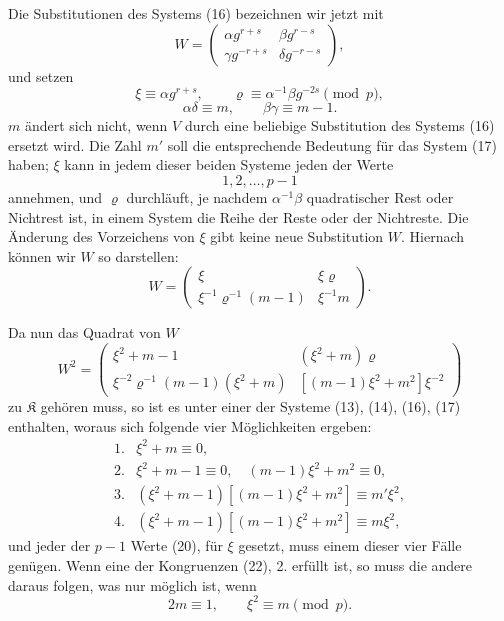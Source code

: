 \documentclass[11pt]{article}
\providecommand{\Kgrp}{\mathfrak K}
\begin{document}
Die Substitutionen des Systems (16) bezeichnen wir jetzt mit
\[
 W=\begin{pmatrix}
 \alpha g^{r+s} & \beta g^{r-s}\\
 \gamma g^{-r+s} & \delta g^{-r-s}
 \end{pmatrix},
\]
und setzen
\begin{equation}
 \xi\equiv\alpha g^{r+s},\qquad \varrho\equiv\alpha^{-1}\beta g^{-2s}\pmod p,
\tag{18}
\end{equation}
\begin{equation}
 \alpha\delta\equiv m,\qquad \beta\gamma\equiv m-1.
\tag{19}
\end{equation}
$m$ ändert sich nicht, wenn $V$ durch eine beliebige Substitution des Systems (16) ersetzt wird. Die Zahl $m'$ soll die entsprechende Bedeutung für das System (17) haben; $\xi$ kann in jedem dieser beiden Systeme jeden der Werte
\begin{equation}
 1,2,\ldots,p-1
\tag{20}
\end{equation}
annehmen, und $\varrho$ durchläuft, je nachdem $\alpha^{-1}\beta$ quadratischer Rest oder Nichtrest ist, in einem System die Reihe der Reste oder der Nichtreste. Die Änderung des Vorzeichens von $\xi$ gibt keine neue Substitution $W$. Hiernach können wir $W$ so darstellen:
\begin{equation}
 W=\begin{pmatrix}
 \xi & \xi\varrho\\
 \xi^{-1}\varrho^{-1}(m-1) & \xi^{-1}m
 \end{pmatrix}.
\tag{21}
\end{equation}

Da nun das Quadrat von $W$
\[
 W^2=\begin{pmatrix}
 \xi^2+m-1 & (\xi^2+m)\varrho\\
 \xi^{-2}\varrho^{-1}(m-1)(\xi^2+m) &
 [(m-1)\xi^2+m^2]\xi^{-2}
 \end{pmatrix}
\]
zu $\Kgrp$ gehören muss, so ist es unter einer der Systeme (13), (14), (16), (17) enthalten, woraus sich folgende vier Möglichkeiten ergeben:
\begin{equation}
\begin{array}{ll}
1.& \xi^2+m\equiv0,\\
2.& \xi^2+m-1\equiv0,\quad (m-1)\xi^2+m^2\equiv0,\\
3.& (\xi^2+m-1)[(m-1)\xi^2+m^2]\equiv m'\xi^2,\\
4.& (\xi^2+m-1)[(m-1)\xi^2+m^2]\equiv m\xi^2,
\end{array}
\tag{22}
\end{equation}
und jeder der $p-1$ Werte (20), für $\xi$ gesetzt, muss einem dieser vier Fälle genügen. Wenn eine der Kongruenzen (22), 2. erfüllt ist, so muss die andere daraus folgen, was nur möglich ist, wenn
\begin{equation}
 2m\equiv1,\qquad \xi^2\equiv m\pmod p.
\tag{23}
\end{equation}
\end{document}
